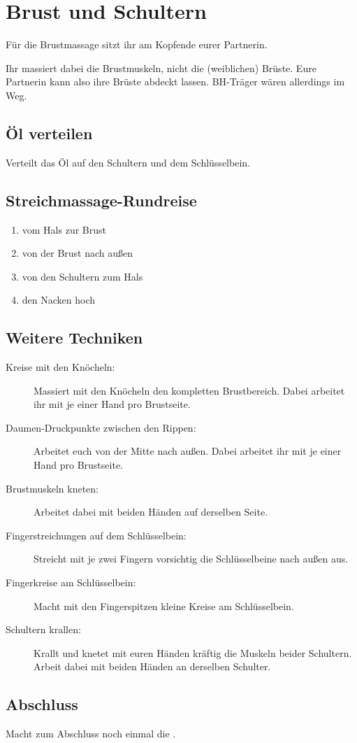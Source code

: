 \section{Brust und Schultern}

Für die Brustmassage sitzt ihr am Kopfende eurer Partnerin.

Ihr massiert dabei die Brustmuskeln, nicht die (weiblichen) Brüste. Eure Partnerin kann also ihre Brüste abdeckt lassen. BH-Träger wären allerdings im Weg.

\subsection{Öl verteilen}
Verteilt das Öl auf den Schultern und dem Schlüsselbein.

\subsection{Streichmassage-Rundreise}

\begin{oframed}
  \begin{enumerate}
    \item vom Hals zur Brust
    \item von der Brust nach außen
    \item von den Schultern zum Hals
    \item den Nacken hoch
  \end{enumerate}
\end{oframed}

\subsection{Weitere Techniken}
\begin{description}
  \item [Kreise mit den Knöcheln:] Massiert mit den Knöcheln den kompletten Brustbereich. Dabei arbeitet ihr mit je einer Hand pro Brustseite.
  \item [Daumen-Druckpunkte zwischen den Rippen:] Arbeitet euch von der Mitte nach außen. Dabei arbeitet ihr mit je einer Hand pro Brustseite.
  \item [Brustmuskeln kneten:] Arbeitet dabei mit beiden Händen auf derselben Seite.
  \item [Fingerstreichungen auf dem Schlüsselbein:] Streicht mit je zwei Fingern vorsichtig die Schlüsselbeine nach außen aus.
  \item [Fingerkreise am Schlüsselbein:] Macht mit den Fingerspitzen kleine Kreise am Schlüsselbein.
  \item [Schultern krallen:] Krallt und knetet mit euren Händen kräftig die Muskeln beider Schultern. Arbeit dabei mit beiden Händen an derselben Schulter.
\end{description}

\subsection{Abschluss}

Macht zum Abschluss noch einmal die .
